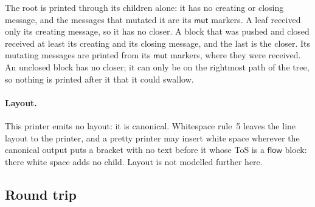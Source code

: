 \documentclass[11pt]{article}
\numberwithin{equation}{section}
\newcommand{\kw}[1]{\ensuremath{\mathsf{#1}}}
\begin{document}
The root is printed through its children alone: it has no creating or
closing message, and the messages that mutated it are its $\kw{mut}$
markers.  A leaf received only its creating message, so it has no closer.  A
block that was pushed and closed received at least its creating and its
closing message, and the last is the closer.  Its mutating messages are
printed from its $\kw{mut}$ markers, where they were received.  An unclosed
block has no closer; it can only be on the rightmost path of the tree, so
nothing is printed after it that it could swallow.

\paragraph{Layout.}
This printer emits no layout: it is canonical.  Whitespace rule~5 leaves the
line layout to the printer, and a pretty printer may insert white space
wherever the canonical output puts a bracket with no text before it whose
ToS is a $\kw{flow}$ block: there white space adds no child.  Layout is not
modelled further here.

\subsection{Round trip}
\end{document}
